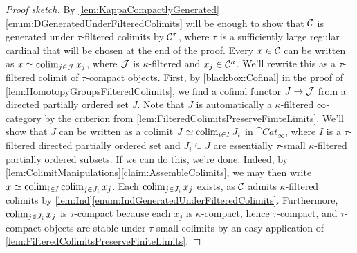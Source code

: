 \begin{proof}[Proof sketch]
	By \cref{lem:KappaCompactlyGenerated}\cref{enum:DGeneratedUnderFilteredColimits} will be enough to show that $\mathcal{C}$ is generated under $\tau$-filtered colimits by $\mathcal{C}^\tau$, where $\tau$ is a sufficiently large regular cardinal that will be chosen at the end of the proof. Every $x\in\mathcal{C}$ can be written as $x\simeq \operatorname*{colim}_{j\in\mathcal{J}}x_j$, where $\mathcal{J}$ is $\kappa$-filtered and $x_j\in\mathcal{C}^\kappa$. We'll rewrite this as a $\tau$-filtered colimit of $\tau$-compact objects. First, by \cref{blackbox:Cofinal} in the proof of \cref{lem:HomotopyGroupsFilteredColimits}, we find a cofinal functor $J\rightarrow\mathcal{J}$ from a directed partially ordered set $J$. Note that $J$ is automatically a $\kappa$-filtered $\infty$-category by the criterion from \cref{lem:FilteredColimitsPreserveFiniteLimits}. We'll show that $J$ can be written as a colimit $J\simeq \operatorname*{colim}_{i\in I}J_i$ in $\cat{Cat}_\infty$, where $I$ is a $\tau$-filtered directed partially ordered set and $J_i\subseteq J$ are essentially $\tau$-small $\kappa$-filtered partially ordered subsets. If we can do this, we're done. Indeed, by \cref{lem:ColimitManipulations}\cref{claim:AssembleColimits}, we may then write $x\simeq \operatorname*{colim}_{i\in I}\operatorname*{colim}_{j\in J_i}x_j$. Each $\operatorname*{colim}_{j\in J_i}x_j$ exists, as $\mathcal{C}$ admits $\kappa$-filtered colimits by \cref{lem:Ind}\cref{enum:IndGeneratedUnderFilteredColimits}. Furthermore, $\operatorname*{colim}_{j\in J_i}x_j$ is $\tau$-compact because each $x_j$ is $\kappa$-compact, hence $\tau$-compact, and $\tau$-compact objects are stable under $\tau$-small colimits by an easy application of \cref{lem:FilteredColimitsPreserveFiniteLimits}.
	

\end{proof}
